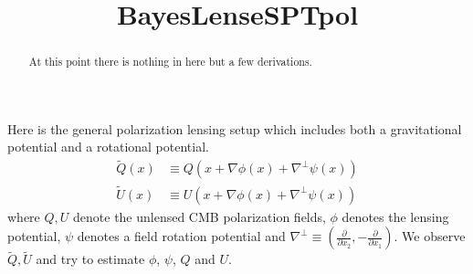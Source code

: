 \documentclass[noinfoline]{imsart}
\begin{document}
\begin{frontmatter}
\title{BayesLenseSPTpol}

\begin{abstract}
At this point there is nothing in here but a few derivations.
\end{abstract}


\end{frontmatter}


Here is the general polarization lensing setup which includes both a gravitational potential and a rotational potential.
\begin{align*}
\widetilde Q(x) &\equiv  Q(x+\nabla \phi(x)+\nabla^\perp \psi(x)) \\
\widetilde U(x) &\equiv  U(x+\nabla \phi(x)+\nabla^\perp \psi(x))
\end{align*}
where $Q, U$ denote the unlensed CMB polarization fields, $\phi$ denotes the lensing potential, $\psi$ denotes a field rotation potential and $\nabla^\perp \equiv(\frac{\partial}{\partial x_2}, -\frac{\partial}{\partial x_1})$.
We observe $\widetilde Q, \widetilde U$ and try to estimate $\phi$, $\psi$, $Q$ and $U$.
\end{document}
